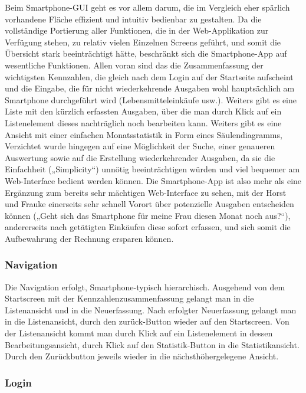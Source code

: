Beim Smartphone-GUI geht es vor allem darum, die im Vergleich eher spärlich
vorhandene Fläche effizient und intuitiv bedienbar zu gestalten. Da die vollstän\-dige Portierung aller Funktionen, die in der Web-Applikation zur Verfügung stehen, zu relativ vielen Einzelnen Screens geführt, und somit die Übersicht stark beeinträchtigt hätte, beschränkt sich die Smartphone-App auf wesentliche Funktionen. Allen voran sind das die Zusammenfassung der wichtigsten Kennzahlen, die gleich nach dem Login auf der Startseite aufscheint und die Eingabe, die für nicht wiederkehrende Ausgaben wohl hauptsächlich am Smartphone durchgeführt wird (Lebensmitteleinkäufe usw.). Weiters gibt es eine Liste mit den kürzlich erfassten Ausgaben, über die man durch Klick auf ein Listenelement dieses nachträglich noch bearbeiten kann. Weiters gibt es eine Ansicht mit einer einfachen Monatsstatistik in Form eines Säulendiagramms,
Verzichtet wurde hingegen auf eine Möglichkeit der Suche, einer genaueren Auswertung sowie auf die Erstellung wiederkehrender Ausgaben, da sie die Einfachheit („Simplicity“) unnötig beeinträchtigen würden und viel bequemer am Web-Interface bedient werden können. Die Smartphone-App ist also mehr als eine Ergänzung zum bereits sehr mächtigen Web-Interface zu sehen, mit der Horst und Frauke einerseits sehr schnell Vorort über potenzielle Ausgaben entscheiden können („Geht sich das Smartphone für meine Frau diesen Monat noch aus?“), andererseits nach getätigten Einkäufen diese sofort erfassen, und sich somit die Aufbewahrung der Rechnung ersparen können.

\subsubsection{Navigation}

Die Navigation erfolgt, Smartphone-typisch hierarchisch. Ausgehend von dem Startscreen mit der Kennzahlenzusammenfassung gelangt man in die Listenansicht und in die Neuerfassung. Nach erfolgter Neuerfassung gelangt man in die Listenansicht, durch den zur\"uck-Button wieder auf den Startscreen. Von der Listenansicht kommt man durch Klick auf ein Listenelement in dessen Bearbeitungsansicht, durch Klick auf den Statistik-Button in die Statistikansicht. Durch den Zur\"uckbutton jeweils wieder in die n\"achsth\"ohergelegene Ansicht.

\subsubsection{Login}

